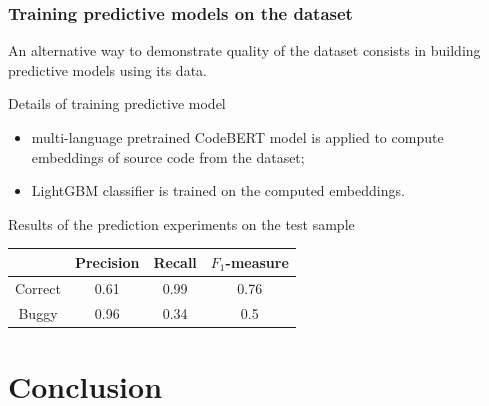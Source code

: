 \documentclass{beamer}
\begin{document}
\begin{frame}
\frametitle{Training predictive models on the dataset}

An alternative way to demonstrate quality of the dataset consists in
building predictive models using its data.

\begin{block}{Details of training predictive model}
\begin{itemize}
\item multi-language pretrained
CodeBERT model is applied to compute embeddings of source code from the dataset;
\item LightGBM classifier is trained on the computed embeddings.
\end{itemize}
\end{block}

\small{Results of the prediction experiments on the test sample}
{\small
\begin{table}[htbp]
\begin{center}
\renewcommand{\arraystretch}{1.2}
\begin{tabular}{| c | c | c | c |}
\hline
    & Precision & Recall &$F_1$-measure \\
\hline
  Correct & 0.61 & 0.99 & 0.76 \\
\hline
  Buggy & 0.96 & 0.34 & 0.5 \\
\hline
\end{tabular}
\label{tab8}
\end{center}
\end{table}}

\end{frame}

\section{Conclusion}
\end{document}
